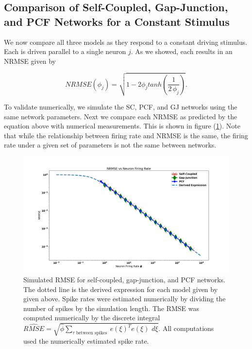 \clearpage

\subsection{Comparison of Self-Coupled, Gap-Junction, and PCF Networks for a Constant Stimulus}

We now compare all three models as they respond to a constant driving stimulus. Each is driven parallel to a single neuron $j$. As we showed, each results in an NRMSE given by 

$$
NRMSE(\phi_j) = 
\sqrt{
	1 - 2 \phi_j tanh \left(\frac{1}{2 \, \phi_j} \right)
}. 
$$
 
 
To validate numerically, we simulate the SC, PCF, and GJ networks using the same network parameters. Next we compare each NRMSE as predicted by the equation above with numerical measurements. This is shown in figure (\ref{fig:analysis:comparison_sc_vs_pcf_vs_gj:per_spike_rmse_sc_pcf_gj}). Note that while the relationship between firing rate and NRMSE is the same, the firing rate under a given set of parameters is not the same between networks. 


\clearpage 


\begin{figure}
\centering
\includegraphics[width=\linewidth]{figures/sc_pcf_gj_nrmse_vs_phi}
\caption{Simulated RMSE for self-coupled, gap-junction, and PCF networks. The dotted line is the derived expression for each model given by given above. Spike rates were estimated numerically by dividing the number of spikes by the simulation length. The RMSE was computed numerically by the discrete integral $\hat{RMSE} = \sqrt{\hat{\phi} \sum_{\tau \text{ between spikes }} e(\xi)^T e(\xi) \, \, d\xi }$. All computations used the numerically estimated spike rate.} 
\label{fig:analysis:comparison_sc_vs_pcf_vs_gj:per_spike_rmse_sc_pcf_gj}
\end{figure}

